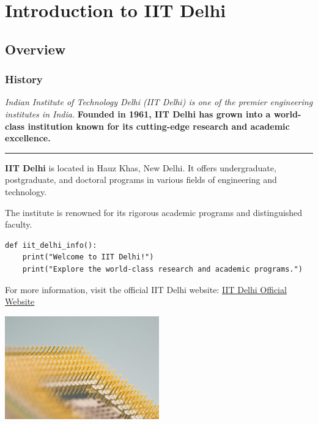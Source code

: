 \documentclass{article}
\begin{document}

\section{Introduction to IIT Delhi}
\subsection{Overview}
\subsubsection{History} %

\textit{Indian Institute of Technology Delhi (IIT Delhi) is one of the premier engineering institutes in India.}
\textbf{Founded in 1961, IIT Delhi has grown into a world-class institution known for its cutting-edge research and academic excellence.}

\hrule %

\textbf{IIT Delhi} is located in Hauz Khas, New Delhi. It offers undergraduate, postgraduate, and doctoral programs in various fields of engineering and technology.\par
The institute is renowned for its rigorous academic programs and distinguished faculty.

\begin{verbatim}
def iit_delhi_info():
    print("Welcome to IIT Delhi!")
    print("Explore the world-class research and academic programs.")
\end{verbatim}

For more information, visit the official IIT Delhi website: \href{https://www.iitd.ac.in}{IIT Delhi Official Website}

\includegraphics[width=0.5\textwidth]{images/technology.jpg}
\end{document}
